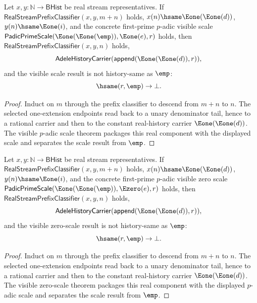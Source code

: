 \begin{theorem}
\label{thm:adele-real-stream-prefix-long-prefix-visible-scale-result-nonempty}
Let $x,y:\mathbb{N}\to\mathsf{BHist}$ be real stream representatives. If
$\mathsf{RealStreamPrefixClassifier}(x,y,m+n)$ holds, $x(n)\hsame
\Eone(\Eone(d))$, $y(n)\hsame\Eone(i)$, and the concrete first-prime
$p$-adic visible scale
$\mathsf{PadicPrimeScale}(\Eone(\Eone(\emp)),\Eone(e),r)$ holds, then
$\mathsf{RealStreamPrefixClassifier}(x,y,n)$ holds,
$$
\mathsf{AdeleHistoryCarrier}(\mathsf{append}(\Eone(\Eone(d)),r)),
$$
and the visible scale result is not history-same as $\emp$:
$$
\hsame(r,\emp)\to\bot.
$$
\end{theorem}
\begin{proof}
Induct on $m$ through the prefix classifier to descend from $m+n$ to $n$.
The selected one-extension endpoints read back to a unary denominator tail,
hence to a rational carrier and then to the constant real-history carrier
$\Eone(\Eone(d))$. The visible $p$-adic scale theorem packages this real
component with the displayed scale and separates the scale result from
$\emp$.
\end{proof}

\begin{theorem}
\label{thm:adele-real-stream-prefix-long-prefix-visible-zero-scale-result-nonempty}
Let $x,y:\mathbb{N}\to\mathsf{BHist}$ be real stream representatives. If
$\mathsf{RealStreamPrefixClassifier}(x,y,m+n)$ holds, $x(n)\hsame
\Eone(\Eone(d))$, $y(n)\hsame\Eone(i)$, and the concrete first-prime
$p$-adic visible zero scale
$\mathsf{PadicPrimeScale}(\Eone(\Eone(\emp)),\Ezero(e),r)$ holds, then
$\mathsf{RealStreamPrefixClassifier}(x,y,n)$ holds,
$$
\mathsf{AdeleHistoryCarrier}(\mathsf{append}(\Eone(\Eone(d)),r)),
$$
and the visible zero-scale result is not history-same as $\emp$:
$$
\hsame(r,\emp)\to\bot.
$$
\end{theorem}
\begin{proof}
Induct on $m$ through the prefix classifier to descend from $m+n$ to $n$.
The selected one-extension endpoints read back to a unary denominator tail,
hence to a rational carrier and then to the constant real-history carrier
$\Eone(\Eone(d))$. The visible zero-scale theorem packages this real component
with the displayed $p$-adic scale and separates the scale result from $\emp$.
\end{proof}

